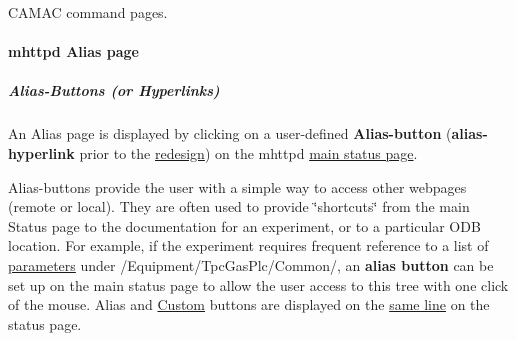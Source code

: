 \par
\par
\par
 \begin{center}  CAMAC command pages. \par
\par
\par
  \end{center}  \par
\par
\par


\par




\par


\label{index_end}
\hypertarget{index_end}{}
 \paragraph{mhttpd Alias page}\label{RC_mhttpd_Alias_page}
\label{RC_mhttpd_Alias_page_idx_mhttpd_page_alias}
\hypertarget{RC_mhttpd_Alias_page_idx_mhttpd_page_alias}{}
 \label{RC_mhttpd_Alias_page_idx_mhttpd_buttons_alias}
\hypertarget{RC_mhttpd_Alias_page_idx_mhttpd_buttons_alias}{}
 \par




\par
 \hypertarget{RC_mhttpd_Alias_page_RC_mhttpd_alias_buttons}{}\subparagraph{Alias-\/Buttons (or Hyperlinks)}\label{RC_mhttpd_Alias_page_RC_mhttpd_alias_buttons}
An Alias page is displayed by clicking on a user-\/defined  {\bfseries  Alias-\/button } ({\bfseries alias-\/hyperlink} prior to the \hyperlink{RC_mhttpd_status_page_redesign}{redesign})  on the mhttpd \hyperlink{RC_mhttpd_status_page_features_RC_mhpptd_optional_buttons}{main status page}.

Alias-\/buttons provide the user with a simple way to access other webpages (remote or local). They are often used to provide \char`\"{}shortcuts\char`\"{} from the main Status page to the documentation for an experiment, or to a particular ODB location. For example, if the experiment requires frequent reference to a list of \hyperlink{structparameters}{parameters} under /Equipment/TpcGasPlc/Common/, an {\bfseries  alias button } can be set up on the main status page to allow the user access to this tree with one click of the mouse.  Alias and \hyperlink{RC_mhttpd_Activate}{Custom} buttons are displayed on the \hyperlink{RC_mhttpd_status_page_redesign}{same line} on the status page. \par



